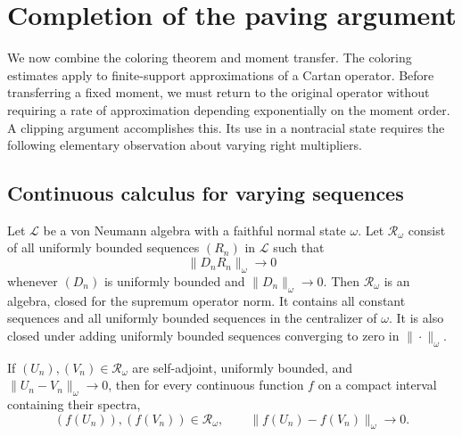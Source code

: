 \section{Completion of the paving argument}\label{sec:completion}

We now combine the coloring theorem and moment transfer. The coloring estimates apply to finite-support approximations of a Cartan operator. Before transferring a fixed moment, we must return to the original operator without requiring a rate of approximation depending exponentially on the moment order. A clipping argument accomplishes this. Its use in a nontracial state requires the following elementary observation about varying right multipliers.

\subsection{Continuous calculus for varying sequences}

\begin{lemma}\label{lem:multiplier-calculus}
Let $\mathcal L$ be a von Neumann algebra with a faithful normal state $\omega$. Let $\mathscr R_\omega$ consist of all uniformly bounded sequences $(R_n)$ in $\mathcal L$ such that
\[
 \|D_nR_n\|_\omega\longrightarrow0
\]
whenever $(D_n)$ is uniformly bounded and $\|D_n\|_\omega\to0$. Then $\mathscr R_\omega$ is an algebra, closed for the supremum operator norm. It contains all constant sequences and all uniformly bounded sequences in the centralizer of $\omega$. It is also closed under adding uniformly bounded sequences converging to zero in $\|\cdot\|_\omega$.

If $(U_n),(V_n)\in\mathscr R_\omega$ are self-adjoint, uniformly bounded, and $\|U_n-V_n\|_\omega\to0$, then for every continuous function $f$ on a compact interval containing their spectra,
\[
 (f(U_n)),(f(V_n))\in\mathscr R_\omega,
 \qquad \|f(U_n)-f(V_n)\|_\omega\longrightarrow0.
\]
\end{lemma}

